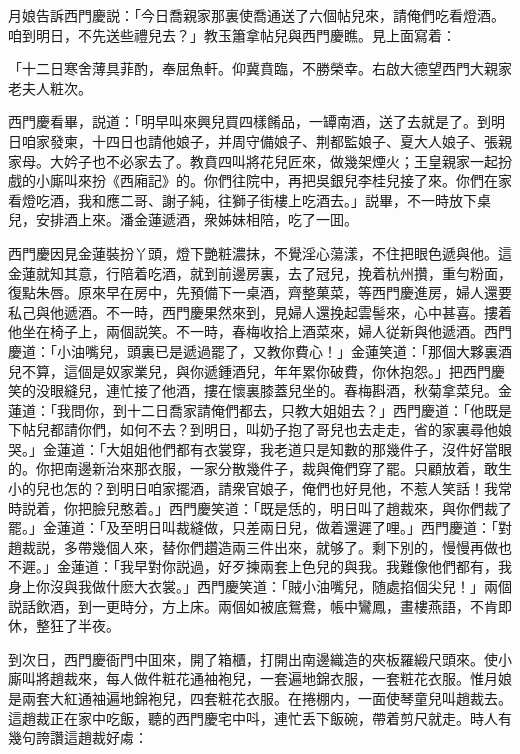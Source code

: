 月娘告訴西門慶説：「今日喬親家那裏使喬通送了六個帖兒來，請俺們吃看燈酒。咱到明日，不先送些禮兒去？」教玉簫拿帖兒與西門慶瞧。見上面寫着：

\begin{myquote}[\markfont]
「十二日寒舍薄具菲酌，奉屈魚軒。仰冀賁臨，不勝榮幸。右啟大德望西門大親家老夫人粧次。

\end{myquote}

西門慶看畢，説道：「明早叫來興兒買四樣餚品，一罈南酒，送了去就是了。到明日咱家發柬，十四日也請他娘子，并周守備娘子、荆都監娘子、夏大人娘子、張親家母。大妗子也不必家去了。教賁四叫將花兒匠來，做幾架煙火；王皇親家一起扮戲的小廝叫來扮《西廂記》的。你們往院中，再把吳銀兒李桂兒接了來。你們在家看燈吃酒，我和應二哥、謝子純，往獅子街樓上吃酒去。」説畢，不一時放下桌兒，安排酒上來。潘金蓮遞酒，衆姊妹相陪，吃了一囬。

西門慶因見金蓮裝扮丫頭，燈下艷粧濃抹，不覺淫心蕩漾，不住把眼色遞與他。這金蓮就知其意，行陪着吃酒，就到前邊房裏，去了冠兒，挽着杭州攢，重勻粉面，復點朱唇。原來早在房中，先預備下一桌酒，齊整菓菜，等西門慶進房，婦人還要私己與他遞酒。不一時，西門慶果然來到，見婦人還挽起雲髻來，心中甚喜。摟着他坐在椅子上，兩個説笑。不一時，春梅收拾上酒菜來，婦人従新與他遞酒。西門慶道：「小油嘴兒，頭裏已是遞過罷了，又教你費心！」金蓮笑道：「那個大夥裏酒兒不算，這個是奴家業兒，與你遞鍾酒兒，年年累你破費，你休抱怨。」把西門慶笑的没眼縫兒，連忙接了他酒，摟在懷裏膝蓋兒坐的。春梅斟酒，秋菊拿菜兒。金蓮道：「我問你，到十二日喬家請俺們都去，只教大姐姐去？」西門慶道：「他既是下帖兒都請你們，如何不去？到明日，叫奶子抱了哥兒也去走走，省的家裏尋他娘哭。」金蓮道：「大姐姐他們都有衣裳穿，我老道只是知數的那幾件子，沒件好當眼的。你把南邊新治來那衣服，一家分散幾件子，裁與俺們穿了罷。只顧放着，敢生小的兒也怎的？到明日咱家擺酒，請衆官娘子，俺們也好見他，不惹人笑話！我常時説着，你把臉兒憨着。」西門慶笑道：「既是恁的，明日叫了趙裁來，與你們裁了罷。」金蓮道：「及至明日叫裁縫做，只差兩日兒，做着還遲了哩。」西門慶道：「對趙裁説，多帶幾個人來，替你們趲造兩三件出來，就够了。剩下別的，慢慢再做也不遲。」金蓮道：「我早對你説過，好歹揀兩套上色兒的與我。我難像他們都有，我身上你沒與我做什麽大衣裳。」西門慶笑道：「賊小油嘴兒，随處掐個尖兒！」兩個説話飲酒，到一更時分，方上床。兩個如被底鴛鴦，帳中鸞鳳，畫樓燕語，不肯即休，整狂了半夜。

到次日，西門慶衙門中囬來，開了箱櫃，打開出南邊織造的夾板羅緞尺頭來。使小廝叫將趙裁來，每人做件粧花通袖袍兒，一套遍地錦衣服，一套粧花衣服。惟月娘是兩套大紅通袖遍地錦袍兒，四套粧花衣服。在捲棚内，一面使琴童兒叫趙裁去。這趙裁正在家中吃飯，聽的西門慶宅中呌，連忙丢下飯碗，帶着剪尺就走。時人有幾句誇讚這趙裁好䖏：

